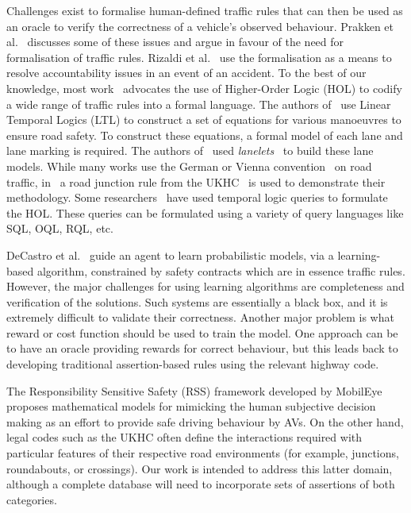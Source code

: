 
Challenges exist to formalise human-defined traffic rules that can then be used as an oracle to verify the correctness of a vehicle's observed behaviour. 
%
Prakken et al.~\cite{lawabidingstudy} discusses some of these issues and argue in favour of the need for formalisation of traffic rules. Rizaldi et al.~\cite{acountability} use the formalisation as a means to resolve accountability issues in an event of an accident. To the best of our knowledge, most work~\cite{acountability, esterle, rizaldi, alves} advocates the use of Higher-Order Logic (HOL) to codify a wide range of traffic rules into a formal language. The authors of~\cite{acountability, esterle, rizaldi, alves} use Linear Temporal Logics (LTL) to construct a set of equations for various manoeuvres to ensure road safety. To construct these equations, a formal model of each lane and lane marking is required. The authors of~\cite{rizaldi} used \textit{lanelets}~\cite{lanelets2014} to build these lane models. While many works use the German or Vienna convention~\cite{vienna} on road traffic, in~\cite{alves} a road junction rule from the UKHC~\cite{highwayCode} is used to demonstrate their methodology. Some researchers~\cite{sqlhuang, sqlgueffaz} have used temporal logic queries to formulate the HOL. These queries can be formulated using a variety of query languages like SQL, OQL, RQL, etc.  

DeCastro et al.~\cite{decastro} guide an agent to learn probabilistic models, via a learning-based algorithm, constrained by safety contracts which are in essence traffic rules. However, the major challenges for using learning algorithms are completeness and verification of the solutions. Such systems are essentially a black box, and it is extremely difficult to validate their correctness. Another major problem is what reward or cost function should be used to train the model. One approach can be to have an oracle providing rewards for correct behaviour, but this leads back to developing traditional assertion-based rules using the relevant highway code.

The Responsibility Sensitive Safety (RSS) framework developed by MobilEye~\cite{RSS_Shalev_Shwartz2017, RSS2_Koopman2019} proposes mathematical models for mimicking the human subjective decision making as an effort to provide safe driving behaviour by AVs. On the other hand, legal codes such as the UKHC often define the interactions required with particular features of their respective road environments (for example, junctions, roundabouts, or crossings). Our work is intended to address this latter domain, although a complete database will need to incorporate sets of assertions of both categories. 

